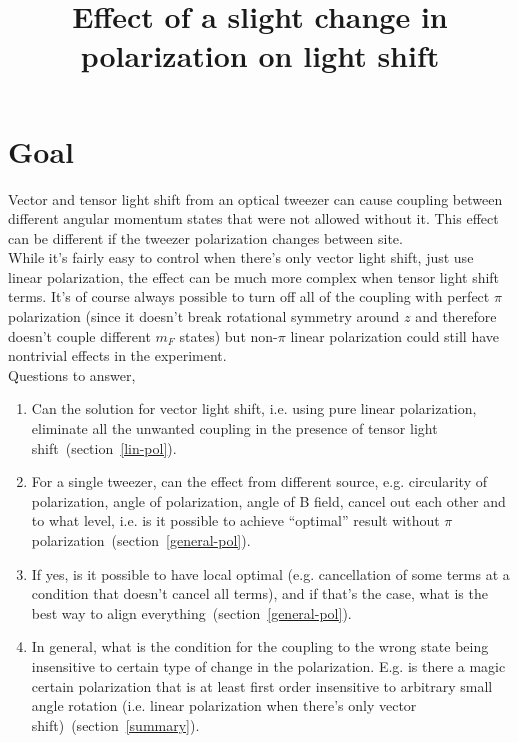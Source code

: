 \documentclass[10pt,fleqn]{article}
\title{Effect of a slight change in polarization on light shift}
\begin{document}
\maketitle

\section{Goal}
Vector and tensor light shift from an optical tweezer can cause coupling
between different angular momentum states that were not allowed without it.
This effect can be different if the tweezer polarization changes between site.\\

While it's fairly easy to control when there's only vector light shift,
just use linear polarization, the effect can be much more complex
when tensor light shift terms. It's of course always possible to turn off
all of the coupling with perfect $\pi$ polarization (since it doesn't break
rotational symmetry around $z$ and therefore doesn't couple different $m_F$ states)
but non-$\pi$ linear polarization could still have nontrivial
effects in the experiment.\\

Questions to answer,
\begin{enumerate}
\item Can the solution for vector light shift, i.e. using pure linear polarization,
  eliminate all the unwanted coupling in the presence of
  tensor light shift~(section~\ref{lin-pol}).
\item For a single tweezer, can the effect from different source,
  e.g. circularity of polarization, angle of polarization, angle of B field,
  cancel out each other and to what level,
  i.e. is it possible to achieve ``optimal'' result
  without $\pi$ polarization~(section~\ref{general-pol}).
\item If yes, is it possible to have local optimal
  (e.g. cancellation of some terms at a condition that doesn't cancel all terms),
  and if that's the case, what is the best way to align
  everything~(section~\ref{general-pol}).
\item In general, what is the condition for the coupling to the wrong state
  being insensitive to certain type of change in the polarization.
  E.g. is there a magic certain polarization that is at least first order insensitive
  to arbitrary small angle rotation
  (i.e. linear polarization when there's only vector shift)~(section~\ref{summary}).
\end{enumerate}
\end{document}
